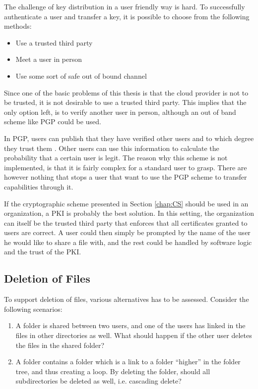 \documentclass[pdftex,english,10pt,b5paper,twoside]{book}
\begin{document}
The challenge of key distribution in a user friendly way is hard. To
successfully authenticate a user and transfer a key, it is possible to choose
from the following methods:

\begin{itemize}
 \item Use a trusted third party
 \item Meet a user in person
 \item Use some sort of safe out of bound channel
\end{itemize}

Since one of the basic problems of this thesis is that the cloud provider is
not to be trusted, it is not desirable to use a trusted third party. This
implies that the only option left, is to verify another user in person,
although an out of band scheme like \ac{PGP} could be used. 

In \ac{PGP}, users can publish that they have verified other users and to which
degree they trust them \cite{stallings}. Other users can use this information
to calculate the probability that a certain user is legit. The reason why this
scheme is not implemented, is that it is fairly complex for a standard user to
grasp. There are however nothing that stops a user that want to use the
\ac{PGP} scheme to transfer capabilities through it.

If the cryptographic scheme presented in Section \ref{chap:CS} should be used
in an organization, a \ac{PKI} is probably the best solution. In this setting,
the organization can itself be the trusted third party that enforces that all
certificates granted to users are correct. A user could then simply be prompted
by the name of the user he would like to share a file with, and the rest could
be handled by software logic and the trust of the \ac{PKI}.

\subsection{Deletion of Files}
\label{sec:deletion_of_files}
To support deletion of files, various alternatives has to be assessed.
Consider the following scenarios:

\begin{enumerate}
  \item A folder is shared between two users, and one of the users has
    linked in the files in other directories as well. What should happen if the
    other user deletes the files in the shared folder?

  \item A folder contains a folder which is a link to a folder ``higher''
    in the folder tree, and thus creating a loop. By deleting the folder,
    should all subdirectories be deleted as well, i.e. cascading delete?
\end{enumerate}
\end{document}

